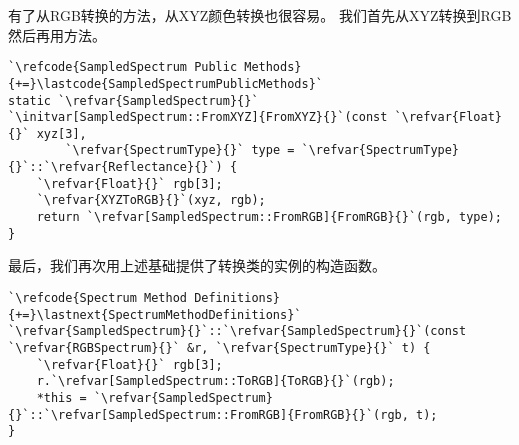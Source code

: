 有了从RGB转换的方法，从XYZ颜色转换也很容易。
我们首先从XYZ转换到RGB然后再用方法。
\begin{lstlisting}
`\refcode{SampledSpectrum Public Methods}{+=}\lastcode{SampledSpectrumPublicMethods}`
static `\refvar{SampledSpectrum}{}` `\initvar[SampledSpectrum::FromXYZ]{FromXYZ}{}`(const `\refvar{Float}{}` xyz[3],
        `\refvar{SpectrumType}{}` type = `\refvar{SpectrumType}{}`::`\refvar{Reflectance}{}`) {
    `\refvar{Float}{}` rgb[3];
    `\refvar{XYZToRGB}{}`(xyz, rgb);
    return `\refvar[SampledSpectrum::FromRGB]{FromRGB}{}`(rgb, type);
}
\end{lstlisting}

最后，我们再次用上述基础提供了转换类的实例的构造函数。
\begin{lstlisting}
`\refcode{Spectrum Method Definitions}{+=}\lastnext{SpectrumMethodDefinitions}`
`\refvar{SampledSpectrum}{}`::`\refvar{SampledSpectrum}{}`(const `\refvar{RGBSpectrum}{}` &r, `\refvar{SpectrumType}{}` t) {
    `\refvar{Float}{}` rgb[3];
    r.`\refvar[SampledSpectrum::ToRGB]{ToRGB}{}`(rgb);
    *this = `\refvar{SampledSpectrum}{}`::`\refvar[SampledSpectrum::FromRGB]{FromRGB}{}`(rgb, t);
}
\end{lstlisting}